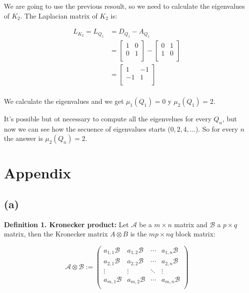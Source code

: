 \documentclass{article}
\begin{document}
\noindent We are going to use the previous resoult, so we need to calculate the eigenvalues of $K_2$. The Laplacian matrix of $K_2$ is:

\begin{align}
\nonumber L_{K_2} = L_{Q_1} & = D_{Q_1} - A_{Q_1} \\\nonumber &  = \begin{bmatrix}
    1 & 0\\
    0 & 1\\
\end{bmatrix} -
\begin{bmatrix}
    0 & 1\\
    1 & 0\\
\end{bmatrix}\\  & = 
\begin{bmatrix}
    1 & -1\\
    -1 & 1\\
\end{bmatrix}
\\ \nonumber 
\end{align}

\noindent We calculate the eigenvalues and we get $\mu_1 (Q_1) = 0$ y $\mu_2 (Q_1) = 2$.

\noindent It's possible but ot necessary to compute all the eigenvelues for every $Q_n$, but now we can see how the secuence of eigenvalues starts ($0, 2, 4, ...$). So for every $n$ the answer is $\mu_2(Q_n) = 2$.


\newpage
\section*{Appendix}

\subsection*{(a)}
\noindent\textbf{Definition 1. Kronecker product: } Let $\mathcal{A}$ be a $m \times n$ matrix and $\mathcal{B}$ a $p \times q$ matrix, then the Kronecker matrix $A \otimes B$ is the $mp \times nq$ block matrix:

$$
\mathcal{A} \otimes \mathcal{B} := 
\begin{pmatrix}
a_{1,1} \mathcal{B} & a_{1,2} \mathcal{B} & \cdots & a_{1,n} \mathcal{B}  \\
a_{2,1} \mathcal{B} & a_{2,2} \mathcal{B} & \cdots & a_{2,n}  \mathcal{B} \\
\vdots & \vdots & \ddots & \vdots\\
a_{m,1} \mathcal{B} & a_{m,2} \mathcal{B} & \cdots & a_{m,n}  \mathcal{B} \\
\end{pmatrix}
$$
\end{document}
